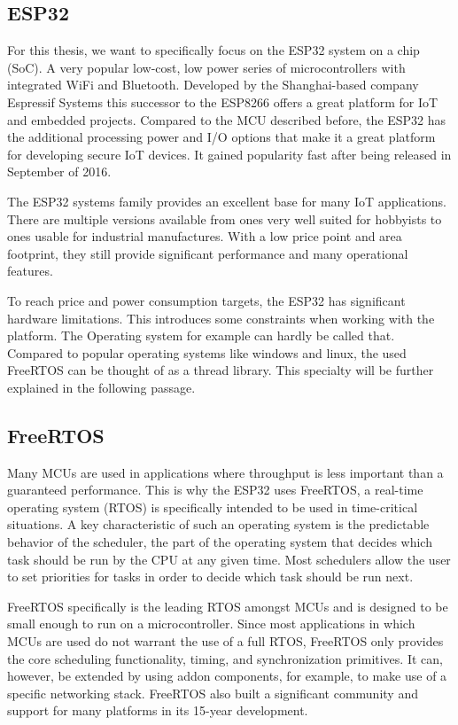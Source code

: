 \subsection{ESP32}
For this thesis, we want to specifically focus on the ESP32 system on a chip (SoC). A very popular low-cost, low power series of microcontrollers with integrated WiFi and Bluetooth. Developed by the Shanghai-based company Espressif Systems this successor to the ESP8266 offers a great platform for IoT and embedded projects\autocite{noauthor_esp32_nodate}. Compared to the MCU described before, the ESP32 has the additional processing power and I/O options that make it a great platform for developing secure IoT devices. It gained popularity fast after being released in September of 2016.

The ESP32 systems family provides an excellent base for many IoT applications. There are multiple versions available from ones very well suited for hobbyists to ones usable for industrial manufactures. With a low price point and area footprint, they still provide significant performance and many operational features\autocite{maier_comparative_2017}.

To reach price and power consumption targets, the ESP32 has significant hardware limitations. This introduces some constraints when working with the platform. The Operating system for example can hardly be called that. Compared to popular operating systems like windows and linux, the used FreeRTOS can be thought of as a thread library. This specialty will be further explained in the following passage.
\subsection{FreeRTOS}\label{subsec:freertos}
Many MCUs are used in applications where throughput is less important than a guaranteed performance. This is why the ESP32 uses FreeRTOS, a real-time operating system (RTOS) is specifically intended to be used in time-critical situations. A key characteristic of such an operating system is the predictable behavior of the scheduler, the part of the operating system that decides which task should be run by the CPU at any given time. Most schedulers allow the user to set priorities for tasks in order to decide which task should be run next.

FreeRTOS specifically is the leading RTOS amongst MCUs and is designed to be small enough to run on a microcontroller\autocite{noauthor_freertos_nodate}. Since most applications in which MCUs are used do not warrant the use of a full RTOS, FreeRTOS only provides the core scheduling functionality, timing, and synchronization primitives. It can, however, be extended by using addon components, for example, to make use of a specific networking stack. FreeRTOS also built a significant community and support for many platforms in its 15-year development.

